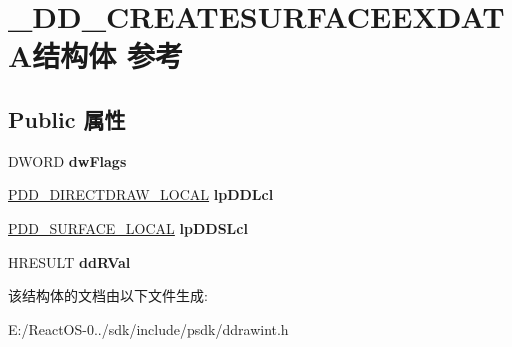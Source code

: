 \hypertarget{struct___d_d___c_r_e_a_t_e_s_u_r_f_a_c_e_e_x_d_a_t_a}{}\section{\+\_\+\+D\+D\+\_\+\+C\+R\+E\+A\+T\+E\+S\+U\+R\+F\+A\+C\+E\+E\+X\+D\+A\+T\+A结构体 参考}
\label{struct___d_d___c_r_e_a_t_e_s_u_r_f_a_c_e_e_x_d_a_t_a}
\subsection*{Public 属性}
\begin{DoxyCompactItemize}
\item 
\mbox{\label{struct___d_d___c_r_e_a_t_e_s_u_r_f_a_c_e_e_x_d_a_t_a_abf91ff2d00bbb8a90d38feab343cfb4d}} 
D\+W\+O\+RD {\bfseries dw\+Flags}
\item 
\mbox{\label{struct___d_d___c_r_e_a_t_e_s_u_r_f_a_c_e_e_x_d_a_t_a_a8d423ad6339e60fb0ec3192c82382085}} 
\hyperlink{struct___d_d___d_i_r_e_c_t_d_r_a_w___l_o_c_a_l}{P\+D\+D\+\_\+\+D\+I\+R\+E\+C\+T\+D\+R\+A\+W\+\_\+\+L\+O\+C\+AL} {\bfseries lp\+D\+D\+Lcl}
\item 
\mbox{\label{struct___d_d___c_r_e_a_t_e_s_u_r_f_a_c_e_e_x_d_a_t_a_a014a409485d81517e78d2b48f8389c06}} 
\hyperlink{struct___d_d___s_u_r_f_a_c_e___l_o_c_a_l}{P\+D\+D\+\_\+\+S\+U\+R\+F\+A\+C\+E\+\_\+\+L\+O\+C\+AL} {\bfseries lp\+D\+D\+S\+Lcl}
\item 
\mbox{\label{struct___d_d___c_r_e_a_t_e_s_u_r_f_a_c_e_e_x_d_a_t_a_a41eeff34525ae3558385746d0d47381c}} 
H\+R\+E\+S\+U\+LT {\bfseries dd\+R\+Val}
\end{DoxyCompactItemize}


该结构体的文档由以下文件生成\+:\begin{DoxyCompactItemize}
\item 
E\+:/\+React\+O\+S-\/0../sdk/include/psdk/ddrawint.\+h\end{DoxyCompactItemize}

